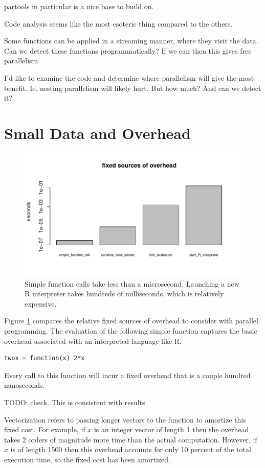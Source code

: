 \documentclass[12pt]{article}
\begin{document}
partools in particular is a nice base to build on.

Code analysis seems like the most esoteric thing compared to the others.

Some functions can be applied in a streaming manner, where they visit the
data. Can we detect these functions programmatically? If we can then this
gives free parallelism.

I'd like to examine the code and determine where parallelism will give the
most benefit. Ie. nesting parallelism will likely hurt. But how much? And
can we detect it?

\section{Small Data and Overhead}

\begin{figure}
\centering
\includegraphics[width=.8\linewidth]{compute_times/overhead}
\caption{Simple function calls take less than a microsecond. Launching a
    new R interpreter takes hundreds of milliseconds, which is relatively expensive.}
\label{fig:overhead}
\end{figure}

Figure \ref{fig:overhead} compares the relative fixed sources of overhead to
consider with parallel programming. The evaluation of the following simple
function captures the basic overhead associated with an interpreted
language like R.
\begin{verbatim}
twox = function(x) 2*x
\end{verbatim}
Every call to this function will incur a fixed overhead that is a couple
hundred nanoseconds. 

TODO: check. This is consistent with results \cite{chambers2016extending}

Vectorization refers to passing longer vectors to the
function to amortize this fixed cost. For example, if $x$ is an integer
vector of length 1 then the overhead takes 2 orders of magnitude more time than
the actual computation. However, if $x$ is of length 1500 then this overhead
accounts for only 10 percent of the total execution time, so the fixed cost
has been amortized.
\end{document}

